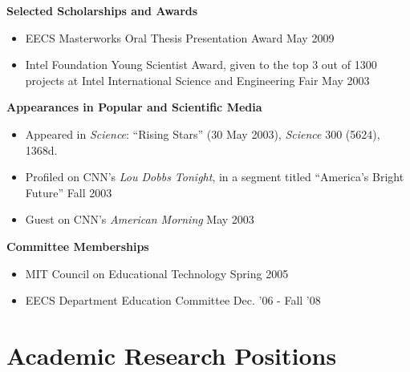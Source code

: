 \documentclass[margin]{res}
\begin{document}
\begin{resume}
\begin{itemize}
               \end{itemize}

{\bf Selected Scholarships and Awards}
                   \begin{itemize} \itemsep -2pt
\item EECS Masterworks Oral Thesis Presentation Award \hfill May 2009   
                
                 \item Intel Foundation Young Scientist Award, given to the top 3 out of 1300 projects at Intel International Science and Engineering Fair \hfill May 2003 


		 \end{itemize}

		 {\bf Appearances in Popular and Scientific Media}
\begin{itemize} \itemsep -2pt
\item Appeared in \textit{Science}: ``Rising Stars'' (30 May 2003), \textit{Science} 300 (5624), 1368d.
\item Profiled on CNN's \textit{Lou Dobbs Tonight}, in a segment titled ``America's Bright Future''  \hfill Fall 2003 
\item Guest on CNN's \textit{American Morning} \hfill May 2003

 \end{itemize}

		 {\bf  Committee Memberships}  
                 \begin{itemize} \itemsep -2pt

               \item    MIT Council on Educational Technology \hfill Spring 2005 
                 
               \item  EECS Department Education Committee \hfill Dec. '06 - Fall '08
 \end{itemize}
		 


          

		
		 

\section{Academic Research Positions}


\end{resume}
\end{document}
